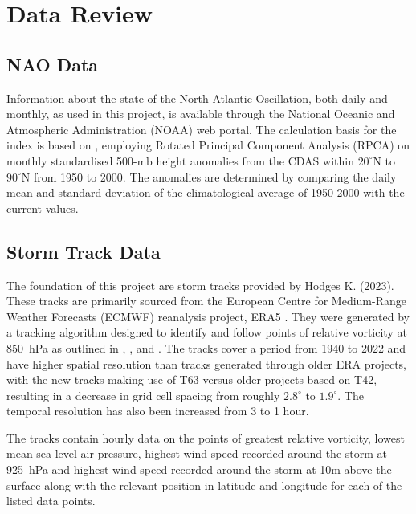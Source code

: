 \section{Data Review}

    \subsection{NAO Data}

        Information about the state of the North Atlantic Oscillation, both daily and monthly, as used in this project, is available through the National Oceanic and Atmospheric Administration (NOAA) web portal. The calculation basis for the index is based on \cite{ClassificationSeasonalityandPersistenceofLowFrequencyAtmosphericCirculationPatterns}, employing Rotated Principal Component Analysis (RPCA) on monthly standardised 500-mb height anomalies from the CDAS within $20^\circ$N to $90^\circ$N from 1950 to 2000. The anomalies are determined by comparing the daily mean and standard deviation of the climatological average of 1950-2000 with the current values.
        
    \subsection{Storm Track Data}
    \label{sec:stormtrackdata}

        The foundation of this project are storm tracks provided by Hodges K. (2023). These tracks are primarily sourced from the European Centre for Medium-Range Weather Forecasts (ECMWF) reanalysis project, ERA5 \citep{ERA5globalreanalysishttps://doi.org/10.1002/qj.3803}. They were generated by a tracking algorithm designed to identify and follow points of relative vorticity at 850~hPa as outlined in \cite{NewPerspectivesontheNorthernHemisphereWinterStormTracks}, \cite{AdaptiveConstraintsforFeatureTracking}, and \cite{FeatureTrackingontheUnitSphere}. The tracks cover a period from 1940 to 2022 and have higher spatial resolution than tracks generated through older ERA projects, with the new tracks making use of T63 versus older projects based on T42, resulting in a decrease in grid cell spacing from roughly $2.8^\circ$ to $1.9^\circ$. The temporal resolution has also been increased from 3 to 1 hour.
        
        The tracks contain hourly data on the points of greatest relative vorticity, lowest mean sea-level air pressure, highest wind speed recorded around the storm at 925~hPa and highest wind speed recorded around the storm at 10m above the surface along with the relevant position in latitude and longitude for each of the listed data points.

